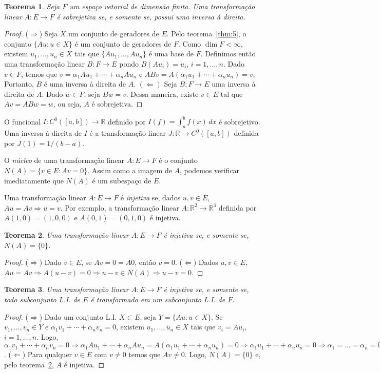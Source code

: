 \documentclass[12pt,a4paper]{article}
\newcommand{\R}{\mathbb{R}}
\newtheorem{thm}{Teorema}[section]
\theoremstyle{definition}
\begin{document}
\begin{thm}
  \label{thm:7}
  Seja $F$ um espaço vetorial de dimensão finita. Uma transformação
  linear $A:E\to F$ é sobrejetiva se, e somente se, possui uma inversa
  à direita.
\end{thm}
\begin{proof}
  ($\Rightarrow$) Seja $X$ um conjunto de geradores de $E$. Pelo
  teorema~\ref{thm:5}, o conjunto $\{Au:u\in X\}$ é um conjunto de
  geradores de $F$. Como $\dim F<\infty$, existem
  $u_1,\ldots,u_n\in X$ tais que $\{Au_1,\ldots,Au_n\}$ é uma base de
  $F$. Definimos então uma transformação linear $B:F\to E$ pondo
  $B(Au_i)=u_i$, $i=1,\ldots, n$. Dado $v\in F$, temos que
  $v=\alpha_1Au_1+\cdots+\alpha_nAu_n$ e
  $ABv=A(\alpha_1u_1+\cdots+\alpha_nu_n)=v$. Portanto, $B$ é uma
  inversa à direita de $A$. $(\Leftarrow)$ Seja $B:F\to E$ uma inversa
  à direita de $A$. Dado $w\in F$, seja $Bw=v$. Dessa maneira, existe
  $v\in E$ tal que $Av=ABw=w$, ou seja, $A$ é sobrejetiva.
\end{proof}

O funcional $I:C^0([a,b])\to \R$ definido por $I(f)=\int_a^bf(x)\,dx$
é sobrejetivo. Uma inversa à direita de $I$ é a transformação linear
$J:\R\to C^0([a,b])$ definida por $J(1)=1/(b-a)$.

O \textit{núcleo} de uma transformação linear $A:E\to F$ é o conjunto
$N(A)=\{v\in E:Av=0\}$. Assim como a imagem de $A$, podemos verificar
imediatamente que $N(A)$ é um subespaço de $E$.

Uma transformação linear $A:E\to F$ é \textit{injetiva} se, dados
$u,v\in E$, $Au=Av\Rightarrow u=v$. Por exemplo, a transformação
linear $A:\R^2\to\R^3$ definida por $A(1,0)=(1,0,0)$ e
$A(0,1)=(0,1,0)$ é injetiva.

\begin{thm}
  \label{thm:8}
  Uma transformação linear $A:E\to F$ é injetiva se, e somente se,
  $N(A)=\{0\}$.
\end{thm}
\begin{proof}
  ($\Rightarrow$) Dado $v\in E$, se $Av=0=A0$, então
  $v=0$. ($\Leftarrow$) Dados $u,v\in E$,
  $Au=Av\Rightarrow A(u-v)=0\Rightarrow u-v\in N(A)\Rightarrow u-v=0$.
\end{proof}

\begin{thm}
  \label{thm:9}
  Uma transformação linear $A:E\to F$ é injetiva se, e somente se,
  todo subconjunto L.I. de $E$ é transformado em um subconjunto
  L.I. de $F$.
\end{thm}
\begin{proof}
  ($\Rightarrow$) Dado um conjunto L.I. $X\subset E$, seja
  $Y=\{Au:u\in X\}$. Se $v_1,\ldots,v_n\in Y$ e
  $\alpha_1v_1+\cdots+\alpha_nv_n=0$, existem $u_1,\ldots,u_n\in X$
  tais que $v_i=Au_i$, $i=1,\ldots,n$. Logo,
  $\alpha_1v_1+\cdots+\alpha_nv_n=0\Rightarrow
  \alpha_1Au_1+\cdots+\alpha_nAu_n=A(\alpha_1u_1+\cdots+\alpha_nu_n)=0\Rightarrow
  \alpha_1u_1+\cdots+\alpha_nu_n=0\Rightarrow
  \alpha_1=\ldots=\alpha_n=0$. ($\Leftarrow$) Para qualquer $v\in E$
  com $v\ne 0$ temos que $Av\ne 0$. Logo, $N(A)=\{0\}$ e, pelo
  teorema~\ref{thm:8}, $A$ é injetiva.
\end{proof}
\end{document}
